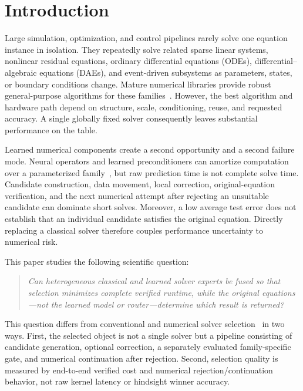 \section{Introduction}
\label{sec:introduction}

Large simulation, optimization, and control pipelines rarely solve one equation
instance in isolation. They repeatedly solve related sparse linear systems,
nonlinear residual equations, ordinary differential equations (ODEs),
differential--algebraic equations (DAEs), and event-driven subsystems as parameters,
states, or boundary conditions change. Mature numerical libraries provide robust
general-purpose algorithms for these families~\cite{saad1986gmres,li2005superlu,
hindmarsh2005sundials,amestoy2001mumps}. However, the best algorithm and hardware
path depend on structure, scale, conditioning, reuse, and requested accuracy. A
single globally fixed solver consequently leaves substantial performance on the
table.

Learned numerical components create a second opportunity and a second failure
mode. Neural operators and learned preconditioners can amortize computation over a
parameterized family~\cite{li2021fno,lu2021deeponet,li2023preconditioner}, but raw
prediction time is not complete solve time. Candidate construction, data movement,
local correction, original-equation verification, and the next numerical attempt after
rejecting an unsuitable candidate can dominate short solves. Moreover, a low average test error does not establish
that an individual candidate satisfies the original equation. Directly replacing
a classical solver therefore couples performance uncertainty to numerical risk.

This paper studies the following scientific question:

\begin{quote}
\emph{Can heterogeneous classical and learned solver experts be fused so that
selection minimizes complete verified runtime, while the original equations---not
the learned model or router---determine which result is returned?}
\end{quote}

This question differs from conventional and numerical solver selection~\cite{rice1976,
kotthoff2014,jessup2016lighthouse} in two ways.
First, the selected object is not a single
solver but a pipeline consisting of candidate generation, optional correction,
a separately evaluated family-specific gate, and numerical continuation after
rejection. Second, selection quality is
measured by end-to-end verified cost and numerical rejection/continuation behavior, not raw kernel latency
or hindsight winner accuracy.

